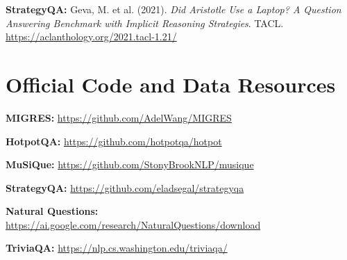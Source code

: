 \documentclass[11pt,a4paper]{article}
\begin{document}
\textbf{StrategyQA:} Geva, M. et al. (2021).
\textit{Did Aristotle Use a Laptop? A Question Answering Benchmark with Implicit Reasoning Strategies}.
TACL.
\url{https://aclanthology.org/2021.tacl-1.21/}

\section*{Official Code and Data Resources}

\textbf{MIGRES:}
\url{https://github.com/AdelWang/MIGRES}

\textbf{HotpotQA:}
\url{https://github.com/hotpotqa/hotpot}

\textbf{MuSiQue:}
\url{https://github.com/StonyBrookNLP/musique}

\textbf{StrategyQA:}
\url{https://github.com/eladsegal/strategyqa}

\textbf{Natural Questions:}
\url{https://ai.google.com/research/NaturalQuestions/download}

\textbf{TriviaQA:}
\url{https://nlp.cs.washington.edu/triviaqa/}
\end{document}
